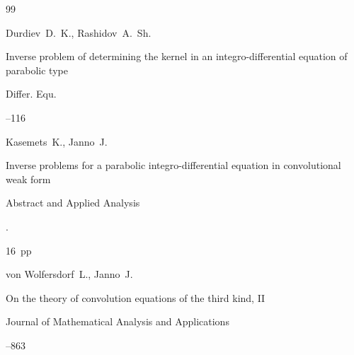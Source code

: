 \begin{thebibliography}{99}




\by Durdiev~D.~K., Rashidov~A.~Sh.

\paper Inverse problem of determining the kernel in an integro-differential equation of parabolic type

\jour Differ. Equ. 



--116 












\by Kasemets~K., Janno~J. 

\paper Inverse problems for a parabolic integro-differential equation in convolutional weak form

\jour Abstract and Applied Analysis



.


16~pp 









\by von Wolfersdorf~L., Janno~J. 

\paper On the theory of convolution equations of the third kind, II


\jour Journal of Mathematical Analysis and Applications




--863






\end{thebibliography}
